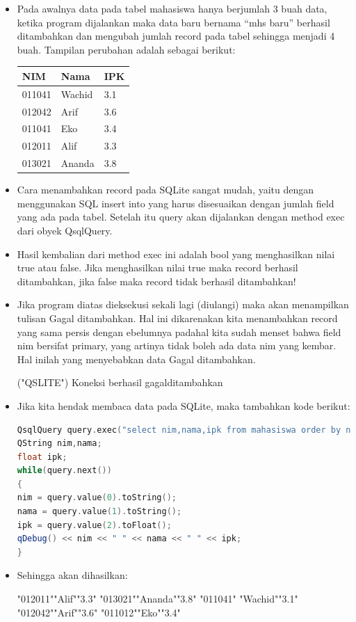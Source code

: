 \begin{itemize}
\item
Pada awalnya data pada tabel mahasiswa hanya berjumlah 3 buah data,
ketika program dijalankan maka data baru bernama ``mhs baru'' berhasil
ditambahkan dan mengubah jumlah record pada tabel sehingga menjadi 4
buah. Tampilan perubahan adalah sebagai berikut:

\begin{tabular}{|l|l|l|}
\hline
NIM & Nama & IPK \\ \hline
011041 & Wachid & 3.1 \\ \hline
012042 & Arif & 3.6 \\ \hline
011041 & Eko & 3.4 \\ \hline
012011 & Alif & 3.3 \\ \hline
013021 & Ananda & 3.8 \\ \hline

\end{tabular}
\item
Cara menambahkan record pada SQLite sangat mudah, yaitu dengan
menggunakan SQL insert into yang harus disesuaikan dengan jumlah field
yang ada pada tabel. Setelah itu query akan dijalankan dengan method
exec dari obyek QsqlQuery.
\item
Hasil kembalian dari method exec ini adalah bool yang menghasilkan
nilai true atau false. Jika menghasilkan nilai true maka record
berhasil ditambahkan, jika false maka record tidak berhasil
ditambahkan!
\item
Jika program diatas dieksekusi sekali lagi (diulangi) maka akan
menampilkan tulisan Gagal ditambahkan. Hal ini dikarenakan kita
menambahkan record yang sama persis dengan ebelumnya padahal kita
sudah menset bahwa field nim bersifat primary, yang artinya tidak
boleh ada data nim yang kembar. Hal inilah yang menyebabkan data Gagal
ditambahkan.
\begin{lcverbatim}
("QSLITE")
Koneksi berhasil
gagalditambahkan
\end{lcverbatim}

\item Jika kita hendak membaca data pada SQLite, maka tambahkan kode berikut:

\begin{lstlisting}[language=c++, caption=Membaca data pada SQLite]
QsqlQuery query.exec("select nim,nama,ipk from mahasiswa order by nim desc");
QString nim,nama;
float ipk;
while(query.next())
{
nim = query.value(0).toString();
nama = query.value(1).toString();
ipk = query.value(2).toFloat();
qDebug() << nim << " " << nama << " " << ipk;
}
\end{lstlisting}

\item Sehingga akan dihasilkan:

\begin{lcverbatim}
"012011""Alif""3.3"
"013021""Ananda""3.8" 
"011041" "Wachid""3.1" 
"012042""Arif""3.6" 
"011012""Eko""3.4" 

\end{lcverbatim}
\end{itemize}



